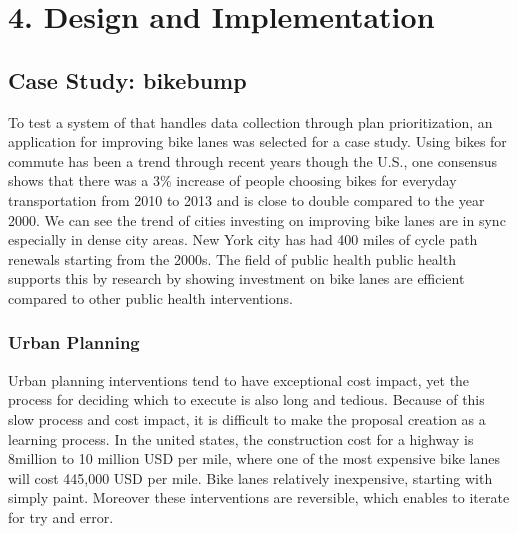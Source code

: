 \newcommand{\repeatcaption}[2]{%
  \renewcommand{\thefigure}{\ref{#1}}%
  \captionsetup{list=no}%
  \caption{#2 (repeated from page \pageref{#1})}%
}

\chapter{4. Design and Implementation}

\section{Case Study: bikebump}
To test a system of that handles data collection through plan
prioritization, an application for improving bike lanes was selected for a
case study. Using bikes for commute has been a trend through recent years
though the U.S., one consensus shows that there was a 3\% increase of
people choosing bikes for everyday transportation from 2010 to 2013 and is
close to double compared to the year 2000.\cite{debra2016onemillion} We can see the trend of cities investing on improving bike lanes are in sync especially in dense city areas. New York city has had 400 miles of cycle path renewals starting from the 2000s. The field of public health public health supports this by research by showing investment on bike lanes are efficient compared to other public health interventions.

\subsection{Urban Planning}
Urban planning interventions tend to have exceptional cost impact, yet the process for deciding which to execute is also long and tedious. Because of this slow process and cost impact, it is difficult to make the proposal creation as a learning process. 
In the united states, the construction cost for a highway is 8million to 10 million USD per mile, where one of the most expensive bike lanes will cost 445,000 USD per mile. Bike lanes relatively inexpensive, starting with simply paint. Moreover these interventions are reversible, which enables to iterate for try and error.

